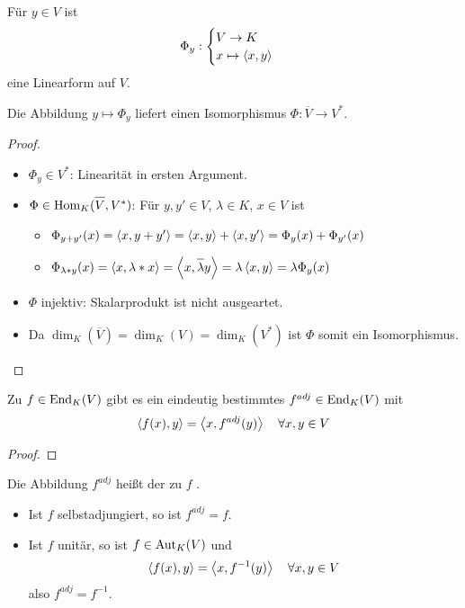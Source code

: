\begin{lemma}
	Für $y\in V$ ist
	\begin{align}
		\Phi_y:
		\begin{cases}
			V\to K \\ x\mapsto\left\langle x,y\right\rangle
		\end{cases}\notag
	\end{align}
	eine Linearform auf $V$.
	
	Die Abbildung $y\mapsto\Phi_y$ liefert einen Isomorphismus $\Phi:\overline{V}\to V^*$.
\end{lemma}
\begin{proof}
	\begin{itemize}
		\item $\Phi_y\in V^*$: Linearität in ersten Argument.
		\item $\Phi\in \Hom_K(\overline{V},V^*)$: Für $y,y'\in V$, $\lambda\in K$, $x\in V$ ist
		\begin{itemize}
			\item $\Phi_{y+y'}(x)=\left\langle x,y+y'\right\rangle=\left\langle x,y\right\rangle+\left\langle x,y'\right\rangle=\Phi_y(x)+\Phi_{y'}(x)$
			\item $\Phi_{\lambda\ast y}(x)=\skalar{x}{\lambda\ast x}=\skalar{x}{\overline{\lambda}y}=\lambda \skalar{x}{y}=\lambda\Phi_y(x)$
		\end{itemize}
		\item $\Phi$ injektiv: Skalarprodukt ist nicht ausgeartet.
		\item Da $\dim_K(\overline{V})=\dim_K(V)=\dim_K(V^*)$ ist $\Phi$ somit ein Isomorphismus.
	\end{itemize}
\end{proof}

\begin{proposition}
	Zu $f\in\operatorname{End}_K(V)$ gibt es ein eindeutig bestimmtes $f^{adj}\in\operatorname{End}_K(V)$ mit 
	\begin{align}
		\left\langle f(x),y\right\rangle=\left\langle x,f^{adj}(y)\right\rangle\quad\forall x,y\in V\notag
	\end{align}
\end{proposition}
\begin{proof}
	
\end{proof}

\begin{definition}
	Die Abbildung $f^{adj}$ heißt der zu $f$ .
\end{definition}

\begin{example}
	\begin{itemize}
		\item Ist $f$ selbstadjungiert, so ist $f^{adj}=f$.
		\item Ist $f$ unitär, so ist $f\in\operatorname{Aut}_K(V)$ und 
		\begin{align}
		\left\langle f(x),y\right\rangle=\left\langle x,f^{-1}(y)\right\rangle\quad\forall x,y\in V\notag
		\end{align}
		also $f^{adj}=f^{-1}$.
	\end{itemize}
\end{example}